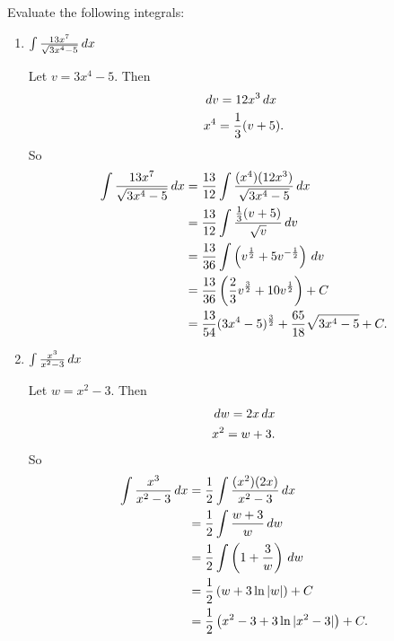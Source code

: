 \documentclass[handout,nooutcomes]{ximera}
\begin{document}
\begin{problem}
Evaluate the following integrals:

	\begin{enumerate}
	
	\item  $\int \frac{13x^7}{\sqrt{3x^4-5}} \,d x$
		\begin{freeResponse}
		Let $v = 3x^4 - 5$.  Then
			\begin{align*}
			&\,d v = 12 x^3 \,d x  \\
			&x^4 = \frac{1}{3} (v + 5).
			\end{align*}
		So
			\begin{align*}
			\int \frac{13x^7}{\sqrt{3x^4-5}} \,d x &= \frac{13}{12} \int \frac{(x^4)(12 x^3)}{\sqrt{3x^4-5}} \,d x  \\
			&= \frac{13}{12} \int \frac{\frac{1}{3} (v+5)}{\sqrt{v}} \,d v  \\
			&= \frac{13}{36} \int \left( v^{\frac{1}{2}} + 5v^{-\frac{1}{2}} \right) \,d v  \\
			&= \frac{13}{36} \left( \frac{2}{3} v^{\frac{3}{2}} + 10 v^{\frac{1}{2}} \right) + C  \\
			&= \frac{13}{54} (3x^4-5)^{\frac{3}{2}} + \frac{65}{18} \sqrt{3x^4 - 5} + C.
			\end{align*}
		\end{freeResponse}
		
		
		
	\item  $\int \frac{x^3}{x^2 - 3} \,d x$
		\begin{freeResponse}
		Let $w = x^2 - 3$.  Then
			\begin{align*}
			&\,d w = 2x \,d x  \\
			&x^2 = w + 3.
			\end{align*}
		So
			\begin{align*}
			\int \frac{x^3}{x^2 - 3} \,d x &= \frac{1}{2} \int \frac{(x^2)(2x)}{x^2 - 3} \,d x  \\
			&= \frac{1}{2} \int \frac{w+3}{w} \,d w  \\
			&= \frac{1}{2} \int \left(1 + \frac{3}{w} \right) \,d w  \\
			&= \frac{1}{2} \left( w + 3 \ln|w| \right) + C  \\
			&= \frac{1}{2} \left( x^2 - 3 + 3\ln|x^2-3| \right) + C.
			\end{align*}
		\end{freeResponse}
		
		
		
	\end{enumerate}
			
			
	
\end{problem}
















	
	
	
	
	
	
	
	
	

	










								
				
				
	
\end{document}
